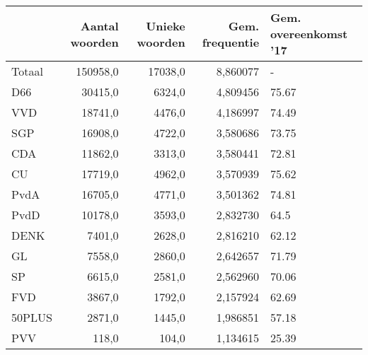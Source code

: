 \begin{tabular}{lrrrl}
\toprule
{} &  Aantal woorden &  Unieke woorden &  Gem. frequentie & Gem. overeenkomst '17 \\
\midrule
Totaal &        150958,0 &         17038,0 &         8,860077 &                     - \\
D66    &         30415,0 &          6324,0 &         4,809456 &                 75.67 \\
VVD    &         18741,0 &          4476,0 &         4,186997 &                 74.49 \\
SGP    &         16908,0 &          4722,0 &         3,580686 &                 73.75 \\
CDA    &         11862,0 &          3313,0 &         3,580441 &                 72.81 \\
CU     &         17719,0 &          4962,0 &         3,570939 &                 75.62 \\
PvdA   &         16705,0 &          4771,0 &         3,501362 &                 74.81 \\
PvdD   &         10178,0 &          3593,0 &         2,832730 &                  64.5 \\
DENK   &          7401,0 &          2628,0 &         2,816210 &                 62.12 \\
GL     &          7558,0 &          2860,0 &         2,642657 &                 71.79 \\
SP     &          6615,0 &          2581,0 &         2,562960 &                 70.06 \\
FVD    &          3867,0 &          1792,0 &         2,157924 &                 62.69 \\
50PLUS &          2871,0 &          1445,0 &         1,986851 &                 57.18 \\
PVV    &           118,0 &           104,0 &         1,134615 &                 25.39 \\
\bottomrule
\end{tabular}
